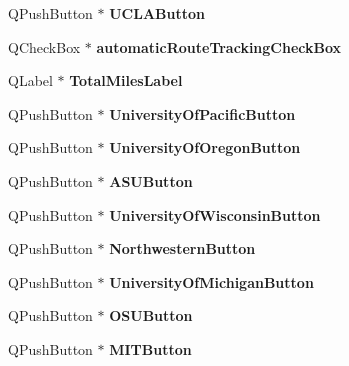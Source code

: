 \begin{DoxyCompactItemize}
Q\+Push\+Button $\ast$ {\bfseries U\+C\+L\+A\+Button}
\item 
\mbox{\label{class_ui___main_window_aae679a28f5d6edb3052fdd1a4a58cba7}} 
Q\+Check\+Box $\ast$ {\bfseries automatic\+Route\+Tracking\+Check\+Box}
\item 
\mbox{\label{class_ui___main_window_a3043f9308a2bff128c4f6b6e90c797e5}} 
Q\+Label $\ast$ {\bfseries Total\+Miles\+Label}
\item 
\mbox{\label{class_ui___main_window_a48a32a92d66ce272d5545a935fc52eac}} 
Q\+Push\+Button $\ast$ {\bfseries University\+Of\+Pacific\+Button}
\item 
\mbox{\label{class_ui___main_window_aaba0b3ac63b7e8d2442b5946bc39d897}} 
Q\+Push\+Button $\ast$ {\bfseries University\+Of\+Oregon\+Button}
\item 
\mbox{\label{class_ui___main_window_ae9795c18b36e81c9850f01429924742a}} 
Q\+Push\+Button $\ast$ {\bfseries A\+S\+U\+Button}
\item 
\mbox{\label{class_ui___main_window_a62af8ed4d24d92946db6767ede29ceba}} 
Q\+Push\+Button $\ast$ {\bfseries University\+Of\+Wisconsin\+Button}
\item 
\mbox{\label{class_ui___main_window_ad67005e00d0006396589b4b4640387d0}} 
Q\+Push\+Button $\ast$ {\bfseries Northwestern\+Button}
\item 
\mbox{\label{class_ui___main_window_ad707347705abc7de8fffbe394e2aafa6}} 
Q\+Push\+Button $\ast$ {\bfseries University\+Of\+Michigan\+Button}
\item 
\mbox{\label{class_ui___main_window_aee1dc89fbeaf7196d6e12136b8f78c1b}} 
Q\+Push\+Button $\ast$ {\bfseries O\+S\+U\+Button}
\item 
\mbox{\label{class_ui___main_window_aff9c6037c833031dc66349edba8ff2ee}} 
Q\+Push\+Button $\ast$ {\bfseries M\+I\+T\+Button}
\item 

\end{DoxyCompactItemize}

